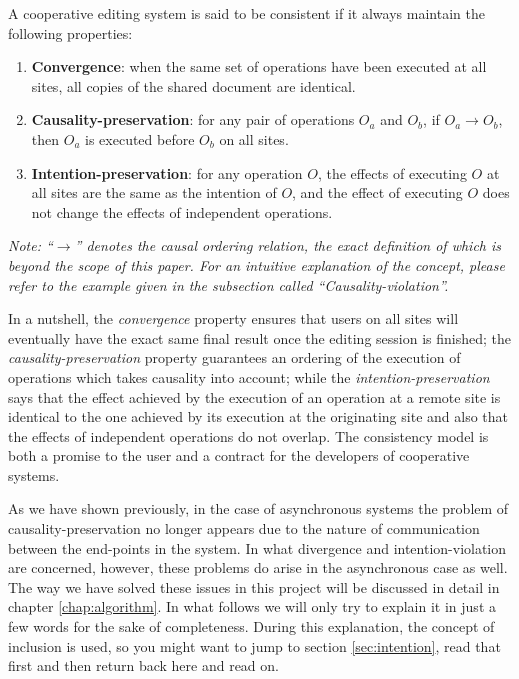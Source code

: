 \begin{defi}
A cooperative editing system is said to be consistent if it always maintain the following
properties:

\begin{enumerate}
\item \textbf{Convergence}: when the same set of operations have been executed at all
      sites, all copies of the shared document are identical.
\item \textbf{Causality-preservation}: for any pair of operations $O_{a}$ and $O_{b}$,
      if $O_{a}\to{}O_{b}$, then $O_{a}$ is executed before $O_{b}$ on all sites.
\item \textbf{Intention-preservation}: for any operation $O$, the effects of executing
      $O$ at all sites are the same as the intention of $O$, and the effect of executing
      $O$ does not change the effects of independent operations.
\end{enumerate}
\end{defi}

\textit{Note: ``$\to$'' denotes the \emph{causal ordering relation}, the exact definition
of which is beyond the scope of this paper. For an intuitive explanation of the concept,
please refer to the example given in the subsection called ``Causality-violation''.}

In a nutshell, the \emph{convergence} property ensures that users on all sites will eventually
have the exact same final result once the editing session is finished; the \emph{causality-preservation}
property guarantees an ordering of the execution of operations which takes causality into
account; while the \emph{intention-preservation} says that the effect achieved by the
execution of an operation at a remote site is identical to the one achieved by its
execution at the originating site and also that the effects of independent operations
do not overlap. The consistency model is both a promise to the user and a contract for
the developers of cooperative systems.

As we have shown previously, in the case of asynchronous systems the problem of
causality-preservation no longer appears due to the nature of communication between
the end-points in the system. In what divergence and intention-violation are
concerned, however, these problems do arise in the asynchronous case as well. The way
we have solved these issues in this project will be discussed in detail in chapter
\ref{chap:algorithm}. In what follows we will only try to explain it in just a few
words for the sake of completeness. During this explanation, the concept of
inclusion is used, so you might want to jump to section \ref{sec:intention}, read
that first and then return back here and read on.

